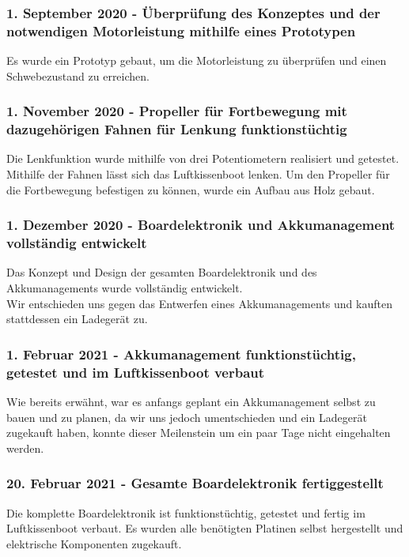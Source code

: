 
\subsubsection*{1. September 2020 - Überprüfung des Konzeptes und der notwendigen Motorleistung mithilfe eines Prototypen}
Es wurde ein Prototyp gebaut, um die Motorleistung zu überprüfen und einen Schwebezustand zu erreichen.\\

\subsubsection*{1. November 2020 - Propeller für Fortbewegung mit dazugehörigen Fahnen für Lenkung funktionstüchtig}
Die Lenkfunktion wurde mithilfe von drei Potentiometern realisiert und getestet. Mithilfe der Fahnen lässt sich das Luftkissenboot lenken. Um den Propeller für 
die Fortbewegung befestigen zu können, wurde ein Aufbau aus Holz gebaut.  \\

\subsubsection*{1. Dezember 2020 - Boardelektronik und  Akkumanagement vollständig entwickelt}
Das Konzept und Design der gesamten Boardelektronik und des Akkumanagements wurde  vollständig entwickelt. \\
Wir entschieden uns gegen das Entwerfen eines Akkumanagements und kauften stattdessen ein Ladegerät zu.\\

\subsubsection*{1. Februar 2021 - Akkumanagement funktionstüchtig, getestet und im Luftkissenboot verbaut}
Wie bereits erwähnt, war es anfangs geplant ein Akkumanagement selbst zu bauen und zu planen, da wir uns jedoch umentschieden und ein Ladegerät zugekauft haben, konnte dieser Meilenstein um ein paar Tage 
nicht eingehalten werden. \\


\subsubsection*{20. Februar 2021 - Gesamte Boardelektronik fertiggestellt}
Die komplette Boardelektronik ist funktionstüchtig, getestet und fertig im Luftkissenboot verbaut. Es wurden alle benötigten Platinen selbst hergestellt
und elektrische Komponenten zugekauft. 

